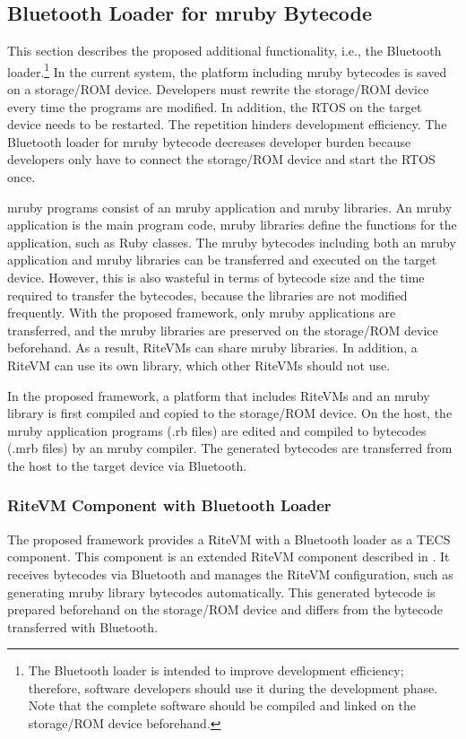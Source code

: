\documentclass[conference]{IEEEtran/IEEEtran/IEEEtran}
\begin{document}
\subsection{Bluetooth Loader for mruby Bytecode}
\label{sec:Bluetooth loader for mruby bytecode}
This section describes the proposed additional functionality, i.e., the Bluetooth loader.\footnote{
The Bluetooth loader is intended to improve development efficiency; therefore, software developers should use it during the development phase.
Note that the complete software should be compiled and linked on the storage/ROM device beforehand.
}
In the current system, the platform including mruby bytecodes is saved on a storage/ROM device.
Developers must rewrite the storage/ROM device every time the programs are modified.
In addition, the RTOS on the target device needs to be restarted.
The repetition hinders development efficiency.
The Bluetooth loader for mruby bytecode decreases developer burden because developers only have to connect the storage/ROM device and start the RTOS once. 

mruby programs consist of an mruby application and mruby libraries.
An mruby application is the main program code, mruby libraries define the functions for the application, such as Ruby classes. 
The mruby bytecodes including both an mruby application and mruby libraries can be transferred and executed on the target device.
However, this is also wasteful in terms of bytecode size and the time required to transfer the bytecodes, because the libraries are not modified frequently.
With the proposed framework, only mruby applications are transferred, and the mruby libraries are preserved on the storage/ROM device beforehand.
As a result, RiteVMs can share mruby libraries.
In addition, a RiteVM can use its own library, which other RiteVMs should not use.

In the proposed framework, a platform that includes RiteVMs and an mruby library is first compiled and copied to the storage/ROM device.
On the host, the mruby application programs (.rb files) are edited and compiled to bytecodes (.mrb files) by an mruby compiler.
The generated bytecodes are transferred from the host to the target device via Bluetooth.

\subsubsection{RiteVM Component with Bluetooth Loader}
The proposed framework provides a RiteVM with a Bluetooth loader as a TECS component.
This component is an extended RiteVM component described in \cite{par:mrubyonTECS}.
It receives bytecodes via Bluetooth and manages the RiteVM configuration, such as generating mruby library bytecodes automatically.
This generated bytecode is prepared beforehand on the storage/ROM device and differs from the bytecode transferred with Bluetooth.
\end{document}
